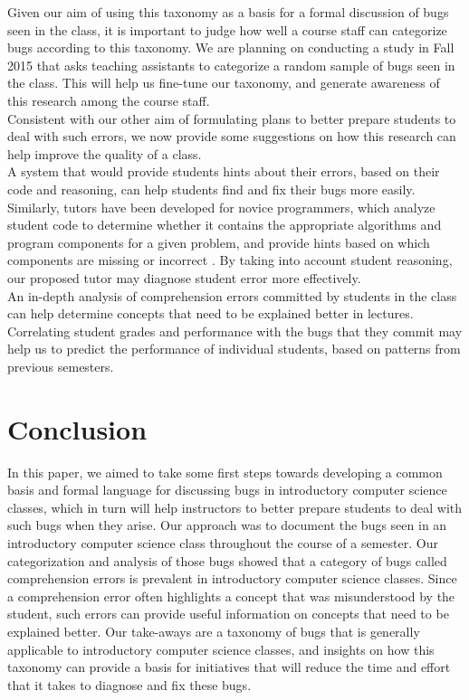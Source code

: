 \documentclass{sig-alternate}
\begin{document}
Given our aim of using this taxonomy as a basis for a formal
discussion of bugs seen in the class, it is important to judge how
well a course staff can categorize bugs according to this taxonomy. We
are planning on conducting a study in Fall 2015 that asks teaching
assistants to categorize a random sample of bugs seen in the class.
This will help us fine-tune our taxonomy, and generate awareness of
this research among the course staff.\\

Consistent with our other aim of formulating plans to better prepare
students to deal with such errors, we now provide some suggestions on
how this research can help improve the quality of a class.\\

A system that would provide students hints about their errors, based
on their code and reasoning, can help students find and fix their bugs
more easily. Similarly, tutors have been developed for novice
programmers, which analyze student code to determine whether it
contains the appropriate algorithms and program components for a given
problem, and provide hints based on which components are missing or
incorrect \cite{Sudol-DeLyser14}. By taking into account student
reasoning, our proposed tutor may diagnose student error more
effectively.\\

An in-depth analysis of comprehension errors committed by students in
the class can help determine concepts that need to be explained better
in lectures.\\

Correlating student grades and performance with the bugs that they
commit may help us to predict the performance of individual students,
based on patterns from previous semesters.

\section{Conclusion}

In this paper, we aimed to take some first steps towards developing a
common basis and formal language for discussing bugs in introductory
computer science classes, which in turn will help instructors to
better prepare students to deal with such bugs when they arise. Our
approach was to document the bugs seen in an introductory computer
science class throughout the course of a semester. Our categorization
and analysis of those bugs showed that a category of bugs called
comprehension errors is prevalent in introductory computer science
classes. Since a comprehension error often highlights a concept that
was misunderstood by the student, such errors can provide useful
information on concepts that need to be explained better. Our
take-aways are a taxonomy of bugs that is generally applicable to
introductory computer science classes, and insights on how this
taxonomy can provide a basis for initiatives that will reduce the time
and effort that it takes to diagnose and fix these bugs.




\balancecolumns

\end{document}
